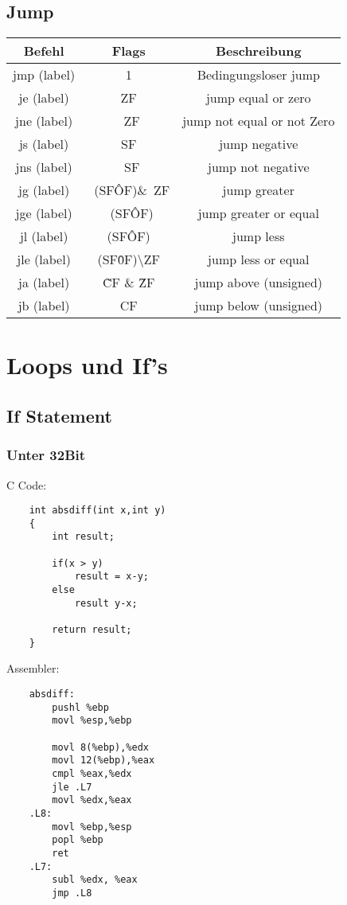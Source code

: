 \documentclass[a4paper, 11pt]{article}
\begin{document}
\subsection{Jump}
\begin{tabular}{|c|c|c|}
	\hline
	Befehl & Flags & Beschreibung\\\hline
	jmp (label) & 1 & Bedingungsloser jump\\\hline
	je (label) & ZF & jump equal or zero \\\hline
	jne (label) & ~ZF & jump not equal or not Zero  \\\hline
	js (label) & SF & jump negative \\\hline
	jns (label) & ~SF & jump not negative  \\\hline
	jg (label) & ~(SF\^OF)\&~ZF & jump greater \\\hline
	jge (label) & ~(SF\^OF) & jump greater or equal \\\hline
	jl (label) & (SF\^OF)& jump less  \\\hline
	jle (label) & (SF\^0F)\textbackslash ZF & jump less or equal \\\hline
	ja (label) & \~CF \& \~ZF & jump above (unsigned) \\\hline
	jb (label) & CF & jump below (unsigned) \\\hline
\end{tabular}


\section{Loops und If's}

\subsection{If Statement}
\subsubsection{Unter 32Bit}
C Code:
\begin{lstlisting}
	int absdiff(int x,int y)
	{
		int result;
		
		if(x > y)
			result = x-y;
		else
			result y-x;
			
		return result;
	}
\end{lstlisting}
Assembler:
\begin{lstlisting}
	absdiff:
		pushl %ebp
		movl %esp,%ebp
		
		movl 8(%ebp),%edx
		movl 12(%ebp),%eax
		cmpl %eax,%edx
		jle .L7			 
		movl %edx,%eax 
	.L8:
		movl %ebp,%esp
		popl %ebp
		ret
	.L7:
		subl %edx, %eax
		jmp .L8
\end{lstlisting}
\end{document}
